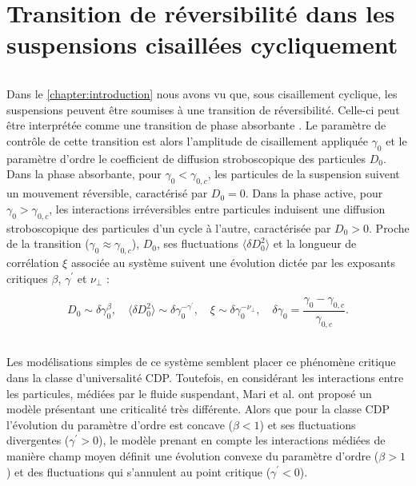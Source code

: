 \chapter{Transition de réversibilité dans les suspensions cisaillées cycliquement}

\label{chapter:Susp}

\subparagraph{}Dans le \autoref{chapter:introduction} nous avons vu que, sous cisaillement cyclique, les suspensions peuvent être soumises à une transition de réversibilité. Celle-ci peut être interprétée comme une transition de phase absorbante \cite{pine_chaos_2005, corte_random_2008, tjhung_criticality_2016, ge_rheology_2022}. Le paramètre de contrôle de cette transition est alors l'amplitude de cisaillement appliquée $\gamma_0$ et le paramètre d'ordre le coefficient de diffusion stroboscopique des particules $D_0$. Dans la phase absorbante, pour $\gamma_0 < \gamma_{0,c}$, les particules de la suspension suivent un mouvement réversible, caractérisé par $D_0 = 0$. Dans la phase active, pour $\gamma_0 > \gamma_{0,c}$, les interactions irréversibles entre particules induisent une diffusion stroboscopique des particules d'un cycle à l'autre, caractérisée par $D_0 >0$. Proche de la transition ($\gamma_0\approx\gamma_{0,c}$), $D_0$, ses fluctuations $\langle \delta D_0^2 \rangle$ et la longueur de corrélation $\xi$ associée au système suivent une évolution dictée par les exposants critiques $\beta$, $\gamma^\prime$ et $\nu_\perp$ : 

\begin{equation}
	D_0 \sim \delta\gamma_0^\beta, \quad \langle \delta D_0^2 \rangle \sim \delta\gamma_0^{-\gamma^\prime},\quad \xi \sim \delta\gamma_0^{-\nu_\perp}, \quad \delta\gamma_0 = \frac{\gamma_0-\gamma_{0,c}}{\gamma_{0,c}}.
\end{equation}

\subparagraph{}Les modélisations simples de ce système \cite{corte_random_2008, tjhung_criticality_2016, ge_rheology_2022} semblent placer ce phénomène critique dans la classe d'universalité CDP. Toutefois, en considérant les interactions entre les particules, médiées par le fluide suspendant, Mari et al. \cite{mari_absorbing_2022} ont proposé un modèle présentant une criticalité très différente. Alors que pour la classe CDP l'évolution du paramètre d'ordre est concave ($\beta < 1$) et ses fluctuations divergentes ($\gamma^\prime>0$), le modèle prenant en compte les interactions médiées de manière champ moyen définit une évolution convexe du paramètre d'ordre ($\beta >1$) et des fluctuations qui s'annulent au point critique ($\gamma^\prime < 0$).

